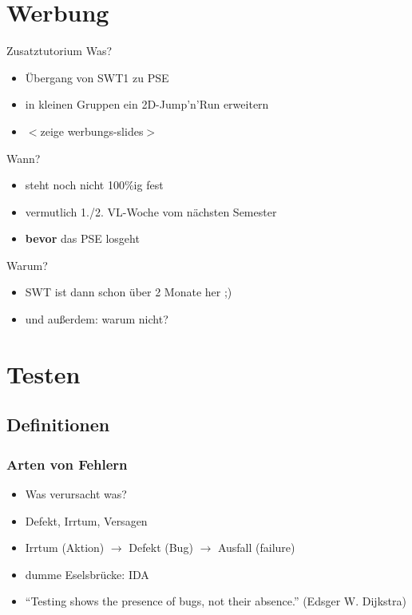 \documentclass[18pt]{beamer}
\begin{document}
\section{Werbung}
\begin{frame}{Zusatztutorium}
	Was?
	\begin{itemize}
		\item Übergang von SWT1 zu PSE
		\item in kleinen Gruppen ein 2D-Jump'n'Run erweitern \pause
		\item $<$zeige werbungs-slides$>$ \pause
	\end{itemize}
	Wann?
	\begin{itemize}
		\item steht noch nicht 100\%ig fest
		\item vermutlich 1./2. VL-Woche vom nächsten Semester
		\item \textbf{bevor} das PSE losgeht \pause
	\end{itemize}
	Warum?
	\begin{itemize}
		\item SWT ist dann schon über 2 Monate her ;)
		\item und außerdem: warum nicht?
	\end{itemize}
\end{frame}
		
\section{Testen}
	\subsection{Definitionen}
	
	\begin{frame}
		\frametitle{Arten von Fehlern}
		\begin{itemize}
			\item Was verursacht was?
			\item Defekt, Irrtum, Versagen \pause
			\item Irrtum (Aktion) $\rightarrow$ Defekt (Bug) $\rightarrow$ Ausfall (failure)
			\item dumme Eselsbrücke: IDA
			\pause
			\item \enquote{Testing shows the presence of bugs, not their absence.} (Edsger W. Dijkstra)
		\end{itemize}
	\end{frame}
\end{document}
